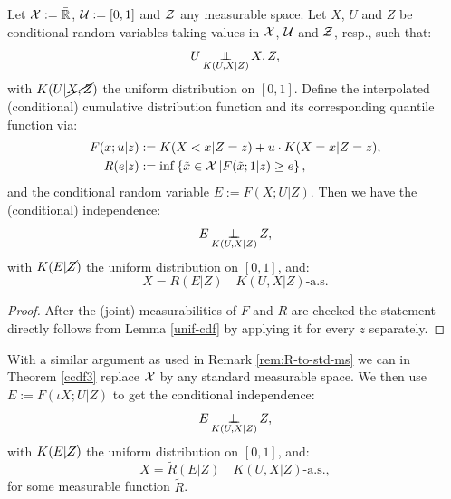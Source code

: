 \begin{Thm}
    \label{ccdf3}
    Let $\mathcal{X}:=\bar {\mathbb{R}}$, $\mathcal{U}:=[0,1]$ and $\mathcal{Z}$ any measurable space.
    Let $X$, $U$ and $Z$ be conditional random variables taking values in $\mathcal{X}$, $\mathcal{U}$ and $\mathcal{Z}$, resp.,
    such that:
    \[ U \operatorname*{\perp\mkern-11mu\perp}_{K(U,X|Z)} X,Z,  \]
    with $K(U|\cancel{X,Z})$ the uniform distribution on $[0,1]$.
    Define the interpolated (conditional) cumulative distribution function and its corresponding quantile function via:
\begin{align*}
    F(x;u|z) &:= K(X<x|Z=z) + u \cdot K(X=x|Z=z),\\
	R(e|z) &:= \inf \left\{ \tilde{x} \in \mathcal{X}\,| F(\tilde{x};1|z) \ge e \right\},
\end{align*}
    and the conditional random variable $E := F(X;U|Z)$.
    Then we have the (conditional) independence:
    \[ E \operatorname*{\perp\mkern-11mu\perp}_{K(U,X|Z)} Z, \]
    with $K(E|\cancel{Z})$ the uniform distribution on $[0,1]$, and:
    \[ X = R(E|Z) \quad K(U,X|Z)\text{-a.s.}\]
    \begin{proof}
        After the (joint) measurabilities of $F$ and $R$ are checked the statement directly follows from 
        Lemma \ref{unif-cdf} by applying it for every $z$ separately.
    \end{proof}
\end{Thm}

\begin{Rem}
    With a similar argument as used in Remark \ref{rem:R-to-std-ms} we can in Theorem \ref{ccdf3} replace $\mathcal{X}$ 
    by any standard measurable space. We then use $E := F(\iota X;U|Z)$ to get 
    the conditional independence:
    \[ E \operatorname*{\perp\mkern-11mu\perp}_{K(U,X|Z)} Z, \]
    with $K(E|\cancel{Z})$ the uniform distribution on $[0,1]$, and:
    \[ X = \tilde R(E|Z) \quad K(U,X|Z)\text{-a.s.},\]
    for some measurable function $\tilde R$.
\end{Rem}

